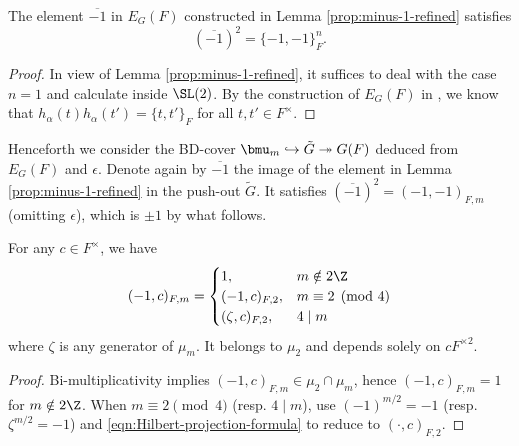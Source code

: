 \documentclass[a4paper,10pt]{article}
\begin{document}
\begin{lemma}
	The element $\overline{-1}$ in $E_G(F)$ constructed in Lemma \ref{prop:minus-1-refined} satisfies
	\[ (\overline{-1})^2 = \{ -1, -1 \}_F^{n}. \]
\end{lemma}
\begin{proof}
	In view of Lemma \ref{prop:minus-1-refined}, it suffices to deal with the case $n=1$ and calculate inside $\SL(2)$. By the construction of $E_G(F)$ in \cite[\S 5]{Mat69}, we know that $h_\alpha(t)h_\alpha(t') = \{t, t'\}_F$ for all $t,t' \in F^\times$.
\end{proof}

Henceforth we consider the BD-cover $\bmu_m \hookrightarrow \tilde{G} \twoheadrightarrow G(F)$ deduced from $E_G(F)$ and $\epsilon$. Denote again by $\overline{-1}$ the image of the element in Lemma \ref{prop:minus-1-refined} in the push-out $\tilde{G}$. It satisfies $(\overline{-1})^2 = (-1, -1)_{F,m}$ (omitting $\epsilon$), which is $\pm 1$ by what follows. 

\begin{lemma}\label{prop:1-c}
	For any $c \in F^\times$, we have
	\[ (-1, c)_{F,m} = \begin{cases}
			1, & m \notin 2\Z \\
			(-1,c)_{F,2}, & m \equiv 2 \pmod 4 \\
			(\zeta, c)_{F,2}, & 4 \mid m
	\end{cases}\]
	where $\zeta$ is any generator of $\mu_m$. It belongs to $\mu_2$ and depends solely on $cF^{\times 2}$.
\end{lemma}
\begin{proof}
	Bi-multiplicativity implies $(-1, c)_{F,m} \in \mu_2 \cap \mu_m$, hence $(-1, c)_{F,m} = 1$ for $m \notin 2\Z$. When $m \equiv 2 \pmod 4$ (resp. $4 \mid m$), use $(-1)^{m/2} = -1$ (resp. $\zeta^{m/2} = -1$) and \eqref{eqn:Hilbert-projection-formula} to reduce to $(\cdot, c)_{F,2}$.
\end{proof}
\end{document}
